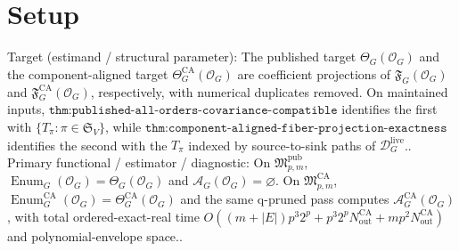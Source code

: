 \documentclass{article}
\begin{document}
\section{Setup}

Target (estimand / structural parameter): The published target \(\Theta_G(\mathcal O_G)\) and the component-aligned target \(\Theta_G^{\mathrm{CA}}(\mathcal O_G)\) are coefficient projections of \(\mathfrak F_G(\mathcal O_G)\) and \(\mathfrak F_G^{\mathrm{CA}}(\mathcal O_G)\), respectively, with numerical duplicates removed. On maintained inputs, \(\texttt{thm:published-all-orders-covariance-compatible}\) identifies the first with \(\{T_\pi:\pi\in\mathfrak S_V\}\), while \(\texttt{thm:component-aligned-fiber-projection-exactness}\) identifies the second with the \(T_\pi\) indexed by source-to-sink paths of \(\mathcal D_G^{\mathrm{live}}\)..
Primary functional / estimator / diagnostic: On \(\mathfrak M_{p,m}^{\mathrm{pub}}\), \(\operatorname{Enum}_G(\mathcal O_G)=\Theta_G(\mathcal O_G)\) and \(\mathcal A_G(\mathcal O_G)=\varnothing\). On \(\mathfrak M_{p,m}^{\mathrm{CA}}\), \(\operatorname{Enum}_G^{\mathrm{CA}}(\mathcal O_G)=\Theta_G^{\mathrm{CA}}(\mathcal O_G)\) and the same q-pruned pass computes \(\mathcal A_G^{\mathrm{CA}}(\mathcal O_G)\), with total ordered-exact-real time \(O((m+|E|)p^3 2^p+p^3 2^pN_{\mathrm{out}}^{\mathrm{CA}}+mp^2N_{\mathrm{out}}^{\mathrm{CA}})\) and polynomial-envelope space..
\end{document}
